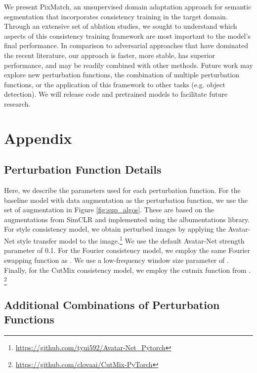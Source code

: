\documentclass[final]{cvpr}
\begin{document}
We present PixMatch, an unsupervised domain adaptation approach for semantic segmentation that incorporates consistency training in the target domain. Through an extensive set of ablation studies, we sought to understand which aspects of this consistency training framework are most important to the model's final performance. In comparison to adversarial approaches that have dominated the recent literature, our approach is faster, more stable, has superior performance, and may be readily combined with other methods. Future work may explore new perturbation functions, the combination of multiple perturbation functions, or the application of this framework to other tasks (e.g. object detection). We will release code and pretrained models to facilitate future research.

\clearpage 

\nocite{*}
{\small


}

\clearpage 

\section*{Appendix}  

\subsection{Perturbation Function Details}

Here, we describe the parameters used for each perturbation function. For the baseline model with data augmentation as the perturbation function, we use the set of augmentation in Figure \ref{fig:sup_algos}. These are based on the augmentations from SimCLR \cite{simclr} and implemented using the albumentations \cite{albumentations} library. For style consistency model, we obtain perturbed images by applying the Avatar-Net \cite{sheng2018avatar} style transfer model to the image.\footnote{\url{https://github.com/tyui592/Avatar-Net_Pytorch}} We use the default Avatar-Net strength parameter of 0.1. For the Fourier consistency model, we employ the same Fourier swapping function as \cite{yang2020fda}. We use a low-frequency window size parameter of . Finally, for the CutMix consistency model, we employ the cutmix function from \cite{yun2019cutmix}. \footnote{\url{https://github.com/clovaai/CutMix-PyTorch}}

\subsection{Additional Combinations of Perturbation Functions}
\end{document}
